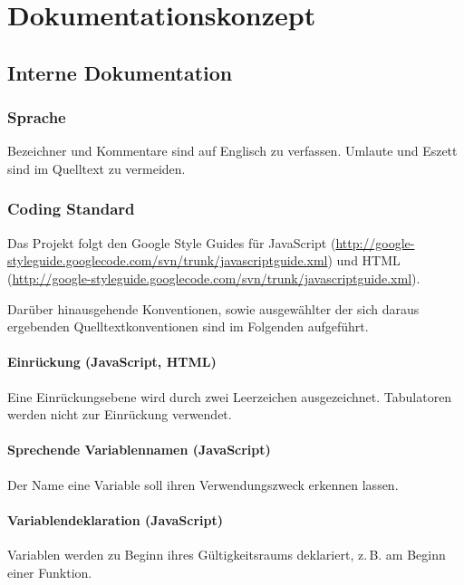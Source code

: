 
\section{Dokumentationskonzept}

\subsection{Interne Dokumentation}

\subsubsection{Sprache}

Bezeichner und Kommentare sind auf Englisch zu verfassen.
Umlaute und Eszett sind im Quelltext zu vermeiden.

\subsubsection{Coding Standard}

Das Projekt folgt den Google Style Guides für JavaScript
(\url{http://google-styleguide.googlecode.com/svn/trunk/javascriptguide.xml})
und HTML (\url{http://google-styleguide.googlecode.com/svn/trunk/javascriptguide.xml}).

Darüber hinausgehende Konventionen, sowie ausgewählter der sich daraus ergebenden Quelltextkonventionen sind im Folgenden aufgeführt.

\paragraph{Einrückung (JavaScript, HTML)}

Eine Einrückungsebene wird durch zwei Leerzeichen ausgezeichnet.
Tabulatoren werden nicht zur Einrückung verwendet.

\paragraph{Sprechende Variablennamen (JavaScript)}

Der Name eine Variable soll ihren Verwendungszweck erkennen lassen.

\paragraph{Variablendeklaration (JavaScript)}

Variablen werden zu Beginn ihres Gültigkeitsraums deklariert,
z.\,B. am Beginn einer Funktion.

